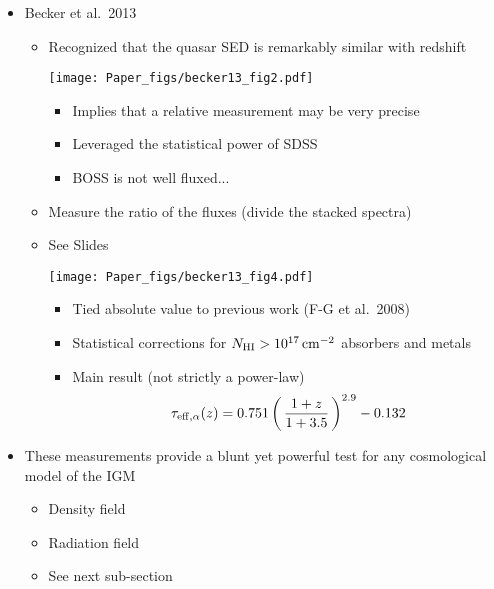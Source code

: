 \documentclass[12pt,letterpaper]{article}
\begin{document}
\begin{Aenumerate}
\begin{itemize}
\begin{itemize}
\begin{itemize}
			\end{itemize}

		\item Becker et al.\ 2013
			\begin{itemize}
			\item Recognized that the quasar SED is remarkably similar with redshift 

	\texttt{[image: Paper\_figs/becker13\_fig2.pdf]}

				\begin{itemize}
				\item Implies that a relative measurement may be very precise
				\item Leveraged the statistical power of SDSS
				\item BOSS is not well fluxed...
				\end{itemize}
			\item Measure the ratio of the fluxes (divide the stacked spectra)
			\item See Slides

	\texttt{[image: Paper\_figs/becker13\_fig4.pdf]}

				\begin{itemize}
				\item Tied absolute value to previous work (F-G et al.\ 2008)
				\item Statistical corrections for $N_{\rm HI} > 10^{17} \, {\rm cm^{-2}}$ absorbers and metals
				\item Main result (not strictly a power-law)
				\begin{equation}
				\tau_{\rm eff, \alpha}(z) = 0.751 \left ( \, \frac{1+z}{1+3.5} 
				\, \right )^{2.9}  - 0.132
				\end{equation}
				\end{itemize}

			\end{itemize}
		\item These measurements provide a blunt yet powerful test
		for any cosmological model of the IGM
			\begin{itemize}
			\item Density field
			\item Radiation field
			\item See next sub-section
			\end{itemize}
		\end{itemize}

	\end{itemize}


\end{Aenumerate}
\end{document}

